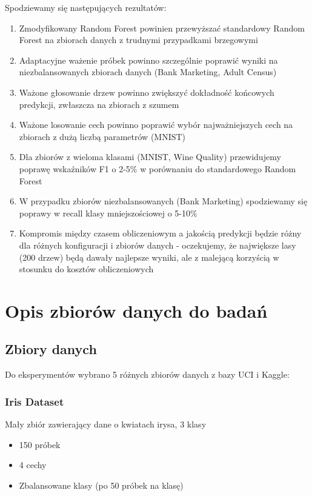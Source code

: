 \documentclass[11pt,a4paper]{article}
\begin{document}
Spodziewamy się następujących rezultatów:
\begin{enumerate}
    \item Zmodyfikowany Random Forest powinien przewyższać standardowy Random Forest na zbiorach danych z trudnymi przypadkami brzegowymi
    \item Adaptacyjne ważenie próbek powinno szczególnie poprawić wyniki na niezbalansowanych zbiorach danych (Bank Marketing, Adult Census)
    \item Ważone głosowanie drzew powinno zwiększyć dokładność końcowych predykcji, zwłaszcza na zbiorach z szumem
    \item Ważone losowanie cech powinno poprawić wybór najważniejszych cech na zbiorach z dużą liczbą parametrów (MNIST)
    \item Dla zbiorów z wieloma klasami (MNIST, Wine Quality) przewidujemy poprawę wskaźników F1 o 2-5\% w porównaniu do standardowego Random Forest
    \item W przypadku zbiorów niezbalansowanych (Bank Marketing) spodziewamy się poprawy w recall klasy mniejszościowej o 5-10\%
    \item Kompromis między czasem obliczeniowym a jakością predykcji będzie różny dla różnych konfiguracji i zbiorów danych - oczekujemy, że największe lasy (200 drzew) będą dawały najlepsze wyniki, ale z malejącą korzyścią w stosunku do kosztów obliczeniowych
\end{enumerate}

\section{Opis zbiorów danych do badań}

\subsection{Zbiory danych}

Do eksperymentów wybrano 5 różnych zbiorów danych z bazy UCI i Kaggle:

\subsubsection{Iris Dataset}
Mały zbiór zawierający dane o kwiatach irysa, 3 klasy
\begin{itemize}
    \item 150 próbek
    \item 4 cechy
    \item Zbalansowane klasy (po 50 próbek na klasę)
\end{itemize}
\end{document}
